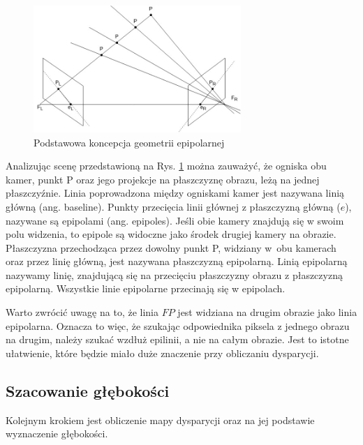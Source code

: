 \documentclass[oneside, eng]{mgr}
\begin{document}
\begin{figure}
\centering
	\includegraphics[width=0.70\textwidth]{epipolar.jpg}\par\vspace{1cm}
\caption{Podstawowa koncepcja geometrii epipolarnej}
	\label{fig:epipolar_scene}
\end{figure}

Analizując scenę przedstawioną na Rys. \ref{fig:epipolar_scene} można zauważyć, że ogniska obu kamer, punkt P oraz jego projekcje na płaszczyznę obrazu, leżą na jednej płaszczyźnie. Linia poprowadzona między ogniskami kamer jest nazywana linią główną (ang. baseline). 
Punkty przecięcia linii głównej z płaszczyzną główną ($e$), nazywane są epipolami (ang. epipoles). Jeśli obie kamery znajdują się w swoim polu widzenia, to epipole są widoczne jako środek drugiej kamery na obrazie.
Płaszczyzna przechodząca przez dowolny punkt P, widziany w~obu kamerach oraz przez linię główną, jest nazywana płaszczyzną epipolarną.
Linią epipolarną nazywamy linię, znajdującą się na przecięciu płaszczyzny obrazu z płaszczyzną epipolarną. Wszystkie linie epipolarne przecinają się w epipolach.

Warto zwrócić uwagę na to, że linia $F P$ jest widziana na drugim obrazie jako linia epipolarna. Oznacza to więc, że szukając odpowiednika piksela z jednego obrazu na drugim, należy szukać wzdłuż epilinii, a nie na całym obrazie. Jest to istotne ułatwienie, które będzie miało duże znaczenie przy obliczaniu dysparycji.

\subsection{Szacowanie głębokości}

Kolejnym krokiem jest obliczenie mapy dysparycji oraz na jej podstawie wyznaczenie głębokości. 
\end{document}
